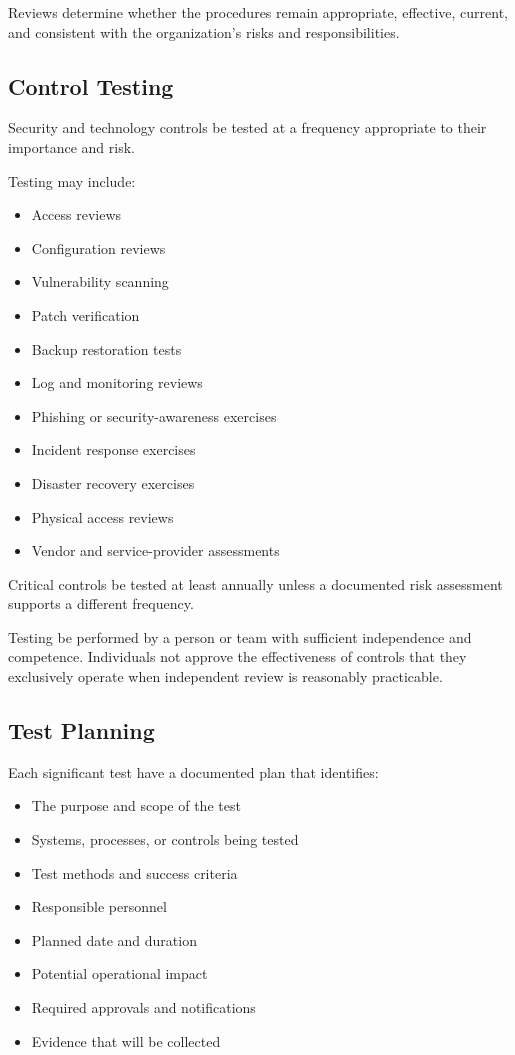 Reviews \must{} determine whether the procedures remain appropriate, effective, current, and consistent with the organization's risks and responsibilities.

\subsection{Control Testing}

Security and technology controls \should{} be tested at a frequency appropriate to their importance and risk.

Testing may include:
\begin{itemize}
    \item Access reviews
    \item Configuration reviews
    \item Vulnerability scanning
    \item Patch verification
    \item Backup restoration tests
    \item Log and monitoring reviews
    \item Phishing or security-awareness exercises
    \item Incident response exercises
    \item Disaster recovery exercises
    \item Physical access reviews
    \item Vendor and service-provider assessments
\end{itemize}

Critical controls \must{} be tested at least annually unless a documented risk assessment supports a different frequency.

Testing \must{} be performed by a person or team with sufficient independence and competence. Individuals \should{} not approve the effectiveness of controls that they exclusively operate when independent review is reasonably practicable.

\subsection{Test Planning}

Each significant test \should{} have a documented plan that identifies:
\begin{itemize}
    \item The purpose and scope of the test
    \item Systems, processes, or controls being tested
    \item Test methods and success criteria
    \item Responsible personnel
    \item Planned date and duration
    \item Potential operational impact
    \item Required approvals and notifications
    \item Evidence that will be collected
\end{itemize}

